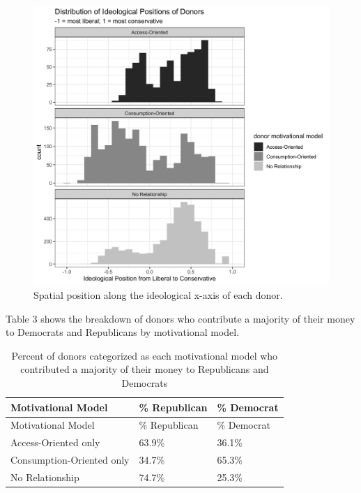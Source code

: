 \documentclass[12pt,]{article}
\begin{document}
\begin{figure}
\centering
\includegraphics{../tables_and_figures/fig_node_position.jpg}
\caption{Spatial position along the ideological x-axis of each donor.}
\end{figure}

Table 3 shows the breakdown of donors who contribute a majority of their
money to Democrats and Republicans by motivational model.

\begin{longtable}[]{@{}lll@{}}
\caption{Percent of donors categorized as each motivational model who
contributed a majority of their money to Republicans and
Democrats}\tabularnewline
\toprule
Motivational Model & \% Republican & \% Democrat \\
\midrule
\endfirsthead
\toprule
Motivational Model & \% Republican & \% Democrat \\
\midrule
\endhead
Access-Oriented only & 63.9\% & 36.1\% \\
Consumption-Oriented only & 34.7\% & 65.3\% \\
No Relationship & 74.7\% & 25.3\% \\
\bottomrule
\end{longtable}
\end{document}
